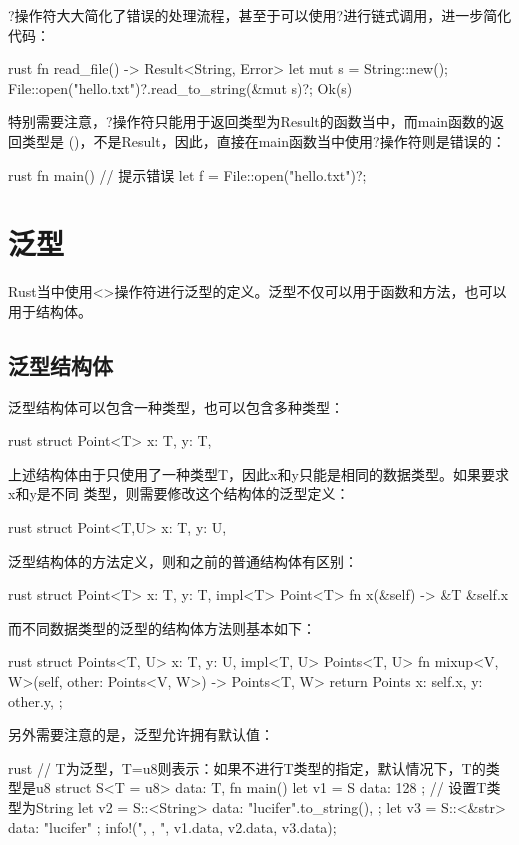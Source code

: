 ?操作符大大简化了错误的处理流程，甚至于可以使用?进行链式调用，进一步简化代码：
\begin{code-block}{rust}
fn read_file() -> Result<String, Error> {
    let mut s = String::new();
    File::open("hello.txt")?.read_to_string(&mut s)?;
    Ok(s)
}
\end{code-block}

特别需要注意，?操作符只能用于返回类型为Result的函数当中，而main函数的返回类型是
()，不是Result，因此，直接在main函数当中使用?操作符则是错误的：
\begin{code-block}{rust}
fn main() {
    // 提示错误
    let f = File::open("hello.txt")?;
}
\end{code-block}

\section{泛型}
Rust当中使用<>操作符进行泛型的定义。泛型不仅可以用于函数和方法，也可以用于结构体。
\subsection{泛型结构体}
泛型结构体可以包含一种类型，也可以包含多种类型：
\begin{code-block}{rust}
struct Point<T> {
    x: T,
    y: T,
}
\end{code-block}
上述结构体由于只使用了一种类型T，因此x和y只能是相同的数据类型。如果要求x和y是不同
类型，则需要修改这个结构体的泛型定义：
\begin{code-block}{rust}
struct Point<T,U> {
    x: T,
    y: U,
}
\end{code-block}

泛型结构体的方法定义，则和之前的普通结构体有区别：
\begin{code-block}{rust}
struct Point<T> {
    x: T,
    y: T,
}
impl<T> Point<T> {
    fn x(&self) -> &T {
        &self.x
    }
}
\end{code-block}

而不同数据类型的泛型的结构体方法则基本如下：
\begin{code-block}{rust}
struct Points<T, U> {
    x: T,
    y: U,
}
impl<T, U> Points<T, U> {
    fn mixup<V, W>(self, other: Points<V, W>) -> Points<T, W> {
        return Points {
            x: self.x,
            y: other.y,
        };
    }
}
\end{code-block}

另外需要注意的是，泛型允许拥有默认值：
\begin{code-block}{rust}
// T为泛型，T=u8则表示：如果不进行T类型的指定，默认情况下，T的类型是u8
struct S<T = u8> {
    data: T,
}
fn main() {
    let v1 = S { data: 128 };
    // 设置T类型为String
    let v2 = S::<String> {
        data: "lucifer".to_string(),
    };
    let v3 = S::<&str> { data: "lucifer" };
    info!("{}, {}, {}", v1.data, v2.data, v3.data);
}
\end{code-block}

